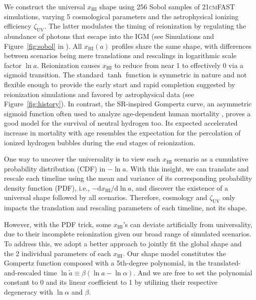 \documentclass[12pt]{article}
\newcommand{\zetaUV}{\zeta_\mathrm{UV}}
\newcommand{\HI}{\mathrm{HI}}
\newcommand{\ap}{\alpha}
\newcommand{\tilt}{\beta}
\newcommand{\ar}{\tilde{a}}
\begin{document}
We construct the universal $x_\HI$ shape using 256 Sobol samples
of \textsc{21cmFAST} simulations, varying 5 cosmological parameters
and the astrophysical ionizing efficiency $\zetaUV$.
The latter modulates the timing of reionization by regulating the
abundance of photons that escape into the IGM (see Simulations
and Figure~\ref{fig:sobol} in \cite{methods}).
All $x_\HI(a)$ profiles share the same shape, with differences between
scenarios being mere translations and rescalings in logarithmic scale
factor $\ln a$.
Reionization causes $x_\HI$ to reduce from near 1 to effectively 0 via a
sigmoid transition.
The standard $\tanh$ function is symmetric in nature and not flexible
enough to provide the early start and rapid completion suggested by
reionization simulations \cite{Trac2018, Doussot2019} and favored by
astrophysical data (see Figure~\ref{fig:history}).
In contrast, the SR-inspired Gompertz curve, an asymmetric sigmoid
function often used to analyze age-dependent human mortality
\cite{Gompertz1825}, proves a good model for the survival of neutral
hydrogen too.
Its expected accelerated increase in mortality with age resembles the
expectation for the percolation of ionized hydrogen bubbles during the
end stages of reionization.

One way to uncover the universality is to view each $x_\HI$ scenario as
a cumulative probability distribution (CDF) in $- \ln a$.
With this insight, we can translate and rescale each timeline using the
mean and variance of its corresponding probability density function
(PDF), i.e., $- \mathrm{d}x_\HI / \mathrm{d}\ln a$, and discover the
existence of a universal shape followed by all scenarios.
Therefore, cosmology and $\zetaUV$ only impacts the translation and
rescaling parameters of each timeline, not its shape.

However, with the PDF trick, some $x_\HI$'s can deviate artificially
from universality, due to their incomplete reionization given our broad
range of simulated scenarios.
To address this, we adopt a better approach to jointly fit the global
shape and the 2 individual parameters of each $x_\HI$.
Our shape model constitutes the Gompertz function composed with a
5th-degree polynomial, in the translated-and-rescaled time $\ln\ar
\equiv \tilt (\ln a - \ln\ap)$.
And we are free to set the polynomial constant to 0 and its linear
coefficient to 1 by utilizing their respective degeneracy with $\ln\ap$
and $\tilt$.
\end{document}

